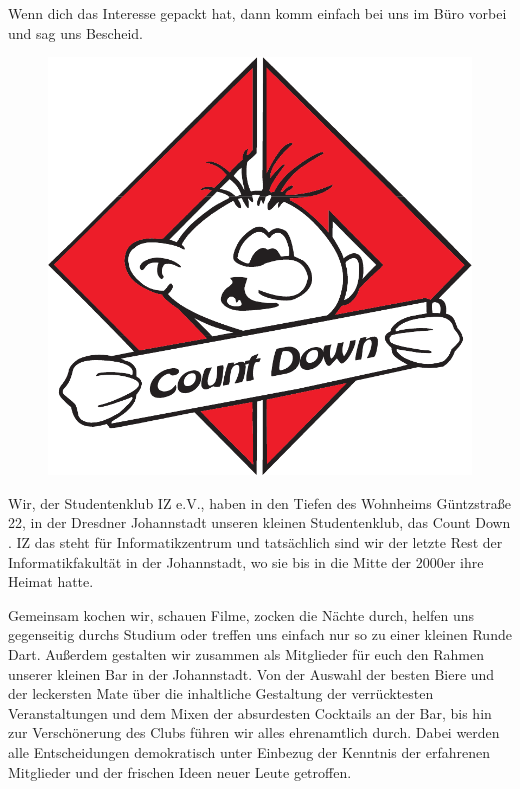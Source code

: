 Wenn dich das Interesse gepackt hat, dann komm einfach bei uns im Büro vorbei und sag uns Bescheid.


\begin{figure}%
  \vspace{-.5cm}
  \includegraphics[width=\linewidth]{img/countdown}
  \vspace{-1cm}
\end{figure}

Wir, der Studentenklub IZ e.V., haben in den Tiefen des Wohnheims Güntzstraße 22, in der Dresdner Johannstadt unseren kleinen Studentenklub, das Count Down .
IZ das steht für Informatikzentrum und tatsächlich sind wir der letzte Rest der Informatikfakultät in der Johannstadt, wo sie bis in die Mitte der 2000er ihre Heimat hatte.

Gemeinsam kochen wir, schauen Filme, zocken die Nächte durch, helfen uns gegenseitig durchs Studium oder treffen uns einfach nur so zu einer kleinen Runde Dart.
Außerdem gestalten wir zusammen als Mitglieder für euch den Rahmen unserer kleinen Bar in der Johannstadt.
Von der Auswahl der besten Biere und der leckersten Mate über die inhaltliche Gestaltung der verrücktesten Veranstaltungen und dem Mixen der absurdesten Cocktails an der Bar, bis hin zur Verschönerung des Clubs führen wir alles ehrenamtlich durch.
Dabei werden alle Entscheidungen demokratisch unter Einbezug der Kenntnis der erfahrenen Mitglieder und der frischen Ideen neuer Leute getroffen.

